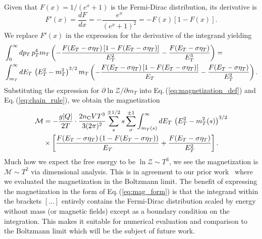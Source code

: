 \documentclass[epjST]{svjour}
\newcommand{\req}[1]{Eq.\,(\ref{#1})}
\begin{document}
Given that \( F(x) = 1/(e^{x} + 1) \) is the Fermi-Dirac distribution, its derivative is
\begin{equation}
F'(x) = \frac{dF}{dx} = -\frac{e^{x}}{(e^{x} + 1)^2} = -F(x)\left[1 - F(x)\right].
\end{equation}
We replace \( F'(x) \) in the expression for the derivative of the integrand yielding
\begin{align}
    \notag
    &\int_{0}^{\infty} dp_{T} \, p_{T}^{4} m_{T} \left( -\frac{F(E_{T} - \sigma\eta_{T})\left[1 - F(E_{T} - \sigma\eta_{T})\right]}{E_{T}^{2}} - \frac{F(E_{T} - \sigma\eta_{T})}{E_{T}^{3}} \right) =\\*
    &\int_{m_{T}}^{\infty} dE_{T} \, \left(E_{T}^{2} - m_{T}^{2}\right)^{3/2} m_{T} \left( -\frac{F(E_{T} - \sigma\eta_{T})\left[1 - F(E_{T} - \sigma\eta_{T})\right]}{E_{T}} - \frac{F(E_{T} - \sigma\eta_{T})}{E_{T}^{2}} \right).
\end{align}
Substituting the expression for \(\partial \ln \mathcal{Z}/\partial m_{T}\) into \req{eq:magnetization_def} and \req{eq:chain_rule}, we obtain the magnetization
\begin{align}
    \notag
    \mathcal{M} &= -\frac{g|Q|}{2 T}\cdot\frac{2 n_\mathrm{C} V T^{3}}{3 (2\pi)^{2}} \sum_{s}^{\pm1/2} s \sum_{\sigma}^{\pm1} \int_{m_{T}(s)}^{\infty} dE_{T} \, \left(E_{T}^{2} - m_{T}^{2}(s)\right)^{3/2} \\
    \label{eq:mag_form}
    &\times\left[ \frac{F(E_{T} - \sigma\eta_{T})\left(1 - F(E_{T} - \sigma\eta_{T})\right)}{E_{T}} + \frac{F(E_{T} - \sigma\eta_{T})}{E_{T}^{2}} \right].
\end{align}
Much how we expect the free energy to be \(\ln\mathcal{Z}\sim T^{3}\), we see the magnetization is \(\mathcal{M}\sim T^{2}\) via dimensional analysis. This is in agreement to our prior work~\cite{Steinmetz:2023nsc,Steinmetz:2023ucp} where we evaluated the magnetization in the Boltzmann limit. The benefit of expressing the magnetization in the form of \req{eq:mag_form} is that the integrand within the brackets \([\ldots]\) entirely contains the Fermi-Dirac distribution scaled by energy without mass (or magnetic fields) except as a boundary condition on the integration. This makes it suitable for numerical evaluation and comparison to the Boltzmann limit which will be the subject of future work.

\end{document}
